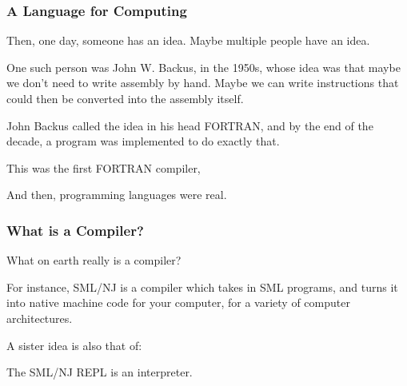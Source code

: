 \documentclass[aspectratio=169, handout]{beamer}
\begin{document}
\begin{frame}[fragile]
  \frametitle{A Language for Computing}

  Then, one day, someone has an idea. Maybe multiple people have an idea.

  \pause
  \vspace{\fill}

  One such person was John W. Backus, in the 1950s, whose idea was that
  maybe we don't need to write assembly by hand. Maybe we can write instructions
  that could then be converted into the assembly itself.

  \pause
  \vspace{\fill}

  John Backus called the idea in his head FORTRAN, and by the end of the decade,
  a program was implemented to do exactly that.

  \pause
  \vspace{\fill}

  This was the first FORTRAN compiler,

  \pause
  \vspace{\fill}

  And then, programming languages were real.
\end{frame}


\begin{frame}[fragile]
  \frametitle{What is a Compiler?}

  What on earth really is a compiler?

  \pause
  \vspace{\fill}


  \pause
  \vspace{\fill}

  For instance, SML/NJ is a compiler which takes in SML programs, and turns it into
  native machine code for your computer, for a variety of computer architectures.

  \pause
  \vspace{\fill}

  A sister idea is also that of:

  \pause
  \vspace{\fill}

  The SML/NJ REPL is an interpreter.
\end{frame}
\end{document}
